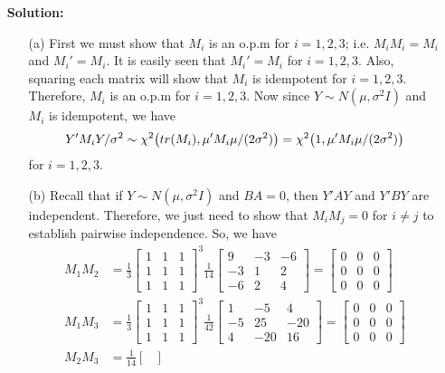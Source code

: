 \documentclass[11pt]{article}
\begin{document}
\begin{itemize}
\item[] {\bf Solution:}
\begin{itemize}
\item[(a)]  First we must show that $M_i$ is an o.p.m for $i=1,2,3$; i.e. $M_iM_i = M_i$ and $M_i' = M_i$.  It is easily seen that $M_i' = M_i$ for $i=1,2,3$.  Also, squaring each matrix will show that $M_i$ is idempotent for $i=1,2,3$.  Therefore, $M_i$ is an o.p.m for $i=1,2,3$.  Now since $Y\sim N(\mu,\sigma^2I)$ and $M_i$ is idempotent, we have
\[
Y'M_iY / \sigma^2 \sim \chi^2\big{(}tr(M_i), \mu' M_i\mu / (2\sigma^2)\big{)} = \chi^2\big{(}1, \mu'M_i\mu / (2\sigma^2)\big{)}
\]
for $i=1,2,3$.
\item[(b)]  Recall that if $Y\sim N(\mu,\sigma^2I)$ and $BA = 0$, then $Y'AY$ and $Y'BY$ are independent.  Therefore, we just need to show that $M_iM_j = 0$ for $i\not= j$ to establish pairwise independence.  So, we have
\begin{align*}
M_1M_2 &= \frac{1}{3}\begin{bmatrix}
1 & 1 & 1 \\
1 & 1 & 1 \\
1 & 1 & 1
\end{bmatrix}^3\frac{1}{14}\begin{bmatrix}
9 & -3 & -6 \\
-3 & 1 & 2 \\
-6 & 2 & 4
\end{bmatrix} = \begin{bmatrix}
0 & 0 & 0 \\
0 & 0 & 0 \\
0 & 0 & 0
\end{bmatrix} \\
M_1M_3 &= \frac{1}{3}\begin{bmatrix}
1 & 1 & 1 \\
1 & 1 & 1 \\
1 & 1 & 1
\end{bmatrix}^3\frac{1}{42}\begin{bmatrix}
1 & -5 & 4 \\
-5 & 25 & -20 \\
4 & -20 & 16
\end{bmatrix} = \begin{bmatrix}
0 & 0 & 0 \\
0 & 0 & 0 \\
0 & 0 & 0
\end{bmatrix} \\
M_2M_3 &= \frac{1}{14}\begin{bmatrix}

\end{bmatrix}
\end{align*}
\end{itemize}
\end{itemize}
\end{document}
